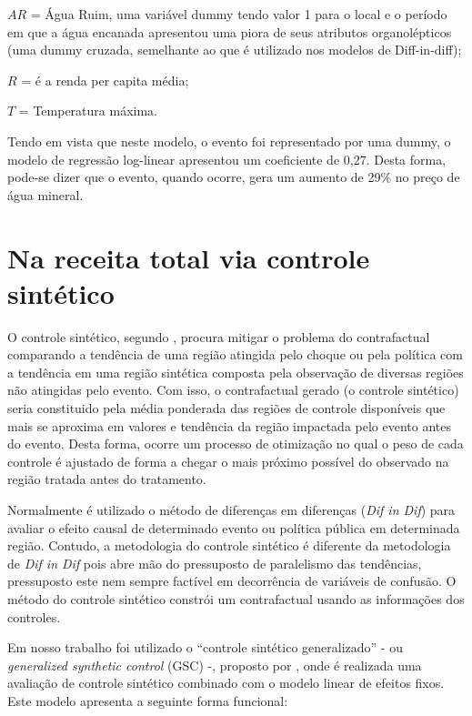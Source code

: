 \documentclass[
  12pt,
]{book}
\begin{document}
\(AR\) = Água Ruim, uma variável dummy tendo valor 1 para o local e o período em que a água encanada apresentou uma piora de seus atributos organolépticos (uma dummy cruzada, semelhante ao que é utilizado nos modelos de Diff-in-diff);

\(R\) = é a renda per capita média;

\(T\) = Temperatura máxima.

Tendo em vista que neste modelo, o evento foi representado por uma dummy, o modelo de regressão log-linear apresentou um coeficiente de 0,27. Desta forma, pode-se dizer que o evento, quando ocorre, gera um aumento de 29\% no preço de água mineral.

\hypertarget{na-receita-total-via-controle-sintuxe9tico}{%
\section{Na receita total via controle sintético}\label{na-receita-total-via-controle-sintuxe9tico}}

O controle sintético, segundo \citet{Sachsida_2018}, procura mitigar o problema do contrafactual comparando a tendência de uma região atingida pelo choque ou pela política com a tendência em uma região sintética composta pela observação de diversas regiões não atingidas pelo evento. Com isso, o contrafactual gerado (o controle sintético) seria constituido pela média ponderada das regiões de controle disponíveis que mais se aproxima em valores e tendência da região impactada pelo evento antes do evento. Desta forma, ocorre um processo de otimização no qual o peso de cada controle é ajustado de forma a chegar o mais próximo possível do observado na região tratada antes do tratamento.

Normalmente é utilizado o método de diferenças em diferenças (\emph{Dif in Dif}) para avaliar o efeito causal de determinado evento ou política pública em determinada região. Contudo, a metodologia do controle sintético é diferente da metodologia de \emph{Dif in Dif} pois abre mão do pressuposto de paralelismo das tendências, pressuposto este nem sempre factível em decorrência de variáveis de confusão. O método do controle sintético constrói um contrafactual usando as informações dos controles.

Em nosso trabalho foi utilizado o ``controle sintético generalizado'' - ou \emph{generalized synthetic control} (GSC) -, proposto por \citet{xu_2017}, onde é realizada uma avaliação de controle sintético combinado com o modelo linear de efeitos fixos. Este modelo apresenta a seguinte forma funcional:
\end{document}
